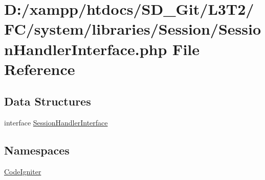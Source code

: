 \hypertarget{system_2libraries_2_session_2_session_handler_interface_8php}{}\section{D\+:/xampp/htdocs/\+S\+D\+\_\+\+Git/\+L3\+T2/\+F\+C/system/libraries/\+Session/\+Session\+Handler\+Interface.php File Reference}
\label{system_2libraries_2_session_2_session_handler_interface_8php}
\subsection*{Data Structures}
\begin{DoxyCompactItemize}
\item 
interface \hyperlink{interface_session_handler_interface}{Session\+Handler\+Interface}
\end{DoxyCompactItemize}
\subsection*{Namespaces}
\begin{DoxyCompactItemize}
\item 
 \hyperlink{namespace_code_igniter}{Code\+Igniter}
\end{DoxyCompactItemize}
